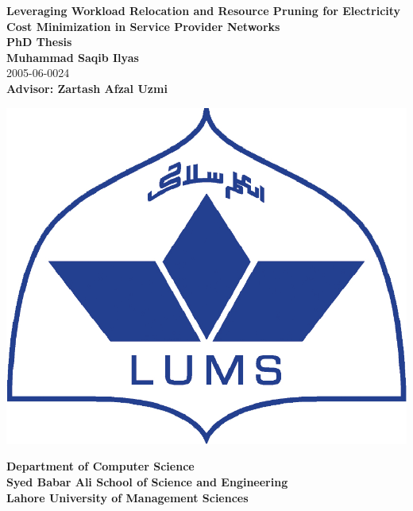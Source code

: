 \newpage
\thispagestyle{empty}
\begin{center}
  \vspace*{0.2in}
  {\LARGE \bf Leveraging Workload Relocation and Resource Pruning for Electricity Cost Minimization in Service Provider Networks}\\
  \vspace*{0.5in}
  {\Large \bf PhD Thesis}\\

  \vspace*{0.4in}
  {\Large\bf Muhammad Saqib Ilyas}\\
    \vspace*{0.2in}
  {\Large 2005-06-0024}\\
  \vspace*{0.4in}
  {\Large\bf Advisor: Zartash Afzal Uzmi}\\

	\vspace*{0.4in}
  \begin{center}
   \includegraphics[scale = 0.5]{./pics/lums-logo.eps}
  \end{center}
  \vspace*{0.4in}  
  {\Large\bf Department of Computer Science} \\
  \vspace*{0.2in}
  {\Large\bf Syed Babar Ali School of Science and Engineering} \\
  \vspace*{0.2in}
  {\Large \bf Lahore University of Management Sciences}
  
  
\end{center}
